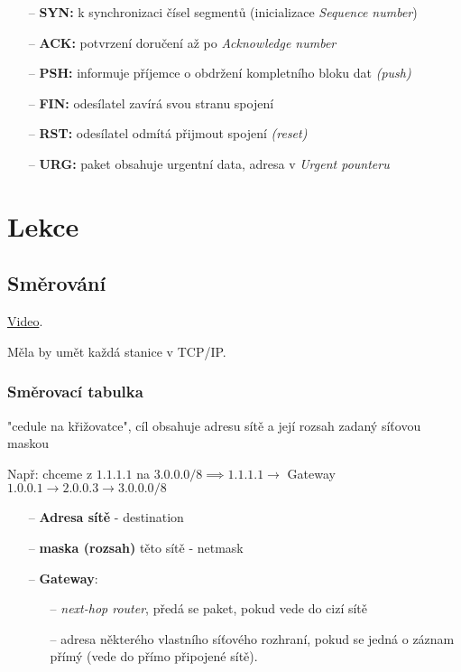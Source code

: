 \documentclass[10pt,a4paper]{article}
\begin{document}
\begin{itemize}
    \item[--] \textbf{SYN:} k synchronizaci čísel segmentů (inicializace \textit{Sequence number})
    \item[--] \textbf{ACK:} potvrzení doručení až po \textit{Acknowledge number}
    \item[--] \textbf{PSH:} informuje příjemce o obdržení kompletního bloku dat \textit{(push)}
    \item[--] \textbf{FIN:} odesílatel zavírá svou stranu spojení
    \item[--] \textbf{RST:} odesílatel odmítá přijmout spojení \textit{(reset)}
    \item[--] \textbf{URG:} paket obsahuje urgentní data, adresa v \textit{Urgent pounteru}
\end{itemize}


\newpage

\section{Lekce}

\subsection{Směrování}

\href{https://youtu.be/s_Ntt6eTn94}{Video}.

Měla by umět každá stanice v TCP/IP.

\subsubsection{Směrovací tabulka} 

"cedule na křižovatce", cíl obsahuje adresu sítě a její rozsah zadaný síťovou maskou

Např: chceme z $1.1.1.1$ na $3.0.0.0/8 \implies 1.1.1.1 \to$ Gateway $1.0.0.1 \to 2.0.0.3 \to 3.0.0.0/8$

\begin{itemize}
    \item[--] \textbf{Adresa sítě} - destination
    \item[--] \textbf{maska (rozsah)} těto sítě -  netmask
    \item[--] \textbf{Gateway}:
    \begin{itemize}
        \item[--] \textit{next-hop router}, předá se paket, pokud vede do cizí sítě
        \item[--] adresa některého vlastního síťového rozhraní, 
        pokud se jedná o záznam přímý (vede do přímo připojené sítě).
    \end{itemize}
\end{itemize}
\end{document}
